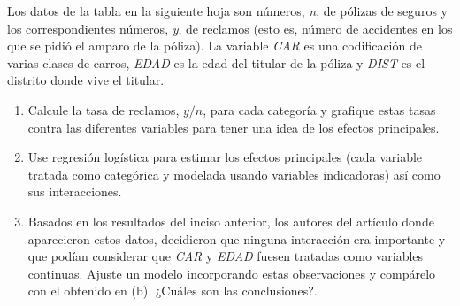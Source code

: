 Los datos de la tabla en la siguiente hoja son números, \textit{n}, de pólizas de seguros y los correspondientes números, \textit{y}, de reclamos (esto es, número de accidentes en los que se pidió el amparo de la póliza). La variable \textit{CAR} es una codificación de varias clases de carros, \textit{EDAD} es la edad del titular de la póliza y \textit{DIST} es el distrito donde vive el titular.

\begin{enumerate}[label=\alph*.]
    \item Calcule la tasa de reclamos, $y/n$, para cada categoría y grafique estas tasas contra las diferentes variables para tener una idea de los efectos principales.
    
    \item Use regresión logística para estimar los efectos principales (cada variable tratada como categórica y modelada usando variables indicadoras) así como sus interacciones.
    
    \item Basados en los resultados del inciso anterior, los autores del artículo donde aparecieron estos datos, decidieron que ninguna interacción era importante y que podían considerar que \textit{CAR} y \textit{EDAD} fuesen tratadas como variables continuas. Ajuste un modelo incorporando estas observaciones y compárelo con el obtenido en (b). ¿Cuáles son las conclusiones?.
\end{enumerate}

